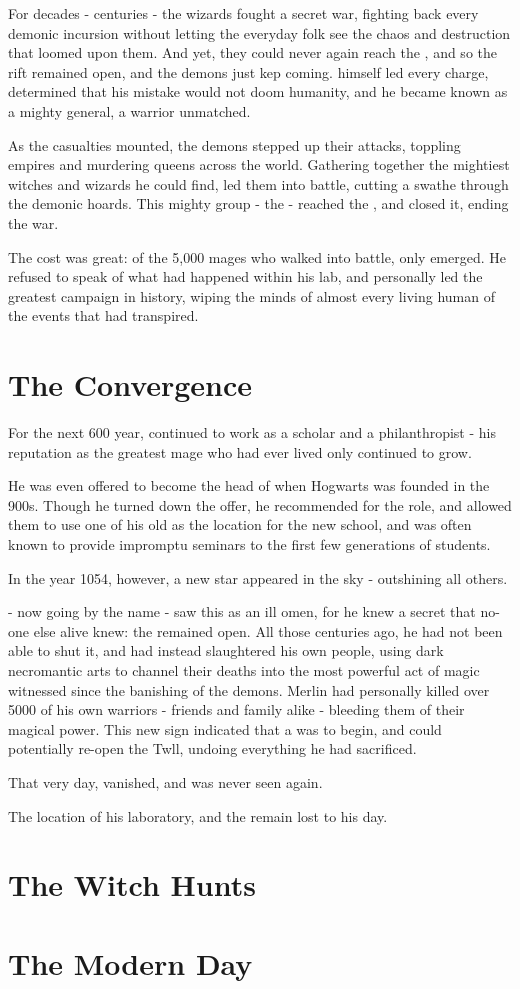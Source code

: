 \documentclass[oneside, 9pt,english]{extbook}
\begin{document}
	
	For decades - centuries - the wizards fought a secret war, fighting back every demonic incursion without letting the everyday folk see the chaos and destruction that loomed upon them. And yet, they could never again reach the , and so the rift remained open, and the demons just kep coming.  himself led every charge, determined that his mistake would not doom humanity, and he became known as a mighty general, a warrior unmatched. 
	
	As the casualties mounted, the demons stepped up their attacks, toppling empires and murdering queens across the world. Gathering together the mightiest witches and wizards he could find,  led them into battle, cutting a swathe through the demonic hoards. This mighty group - the  - reached the , and closed it, ending the war. 
	
	The cost was great: of the 5,000 mages who walked into battle, only  emerged. He refused to speak of what had happened within his lab, and personally led the greatest  campaign in history, wiping the minds of almost every living human of the events that had transpired. 
	
	\section{The Convergence}
	
	For the next 600 year,  continued to work as a scholar and a philanthropist - his reputation as the greatest mage who had ever lived only continued to grow. 
	
	He was even offered to become the head of  when Hogwarts was founded in the 900s. Though he turned down the offer, he recommended  for the role, and allowed them to use one of his old  as the location for the new school, and was often known to provide impromptu seminars to the first few generations of students. 
	
	In the year 1054, however, a new star appeared in the sky - outshining all others. 
	
	 - now going by the name  - saw this as an ill omen, for he knew a secret that no-one else alive knew: the  remained open. All those centuries ago, he had not been able to shut it, and had instead slaughtered his own people, using dark necromantic arts to channel their deaths into the most powerful act of magic witnessed since the banishing of the demons. Merlin had personally killed over 5000 of his own warriors - friends and family alike - bleeding them of their magical power. This new sign indicated that a  was to begin, and could potentially re-open the Twll, undoing everything he had sacrificed. 
		
	That very day,  vanished, and was never seen again.
	
	The location of his laboratory, and the  remain lost to his day. 
	
	
	
	\section{The Witch Hunts}
	
	\section{The Modern Day}
\end{document}
